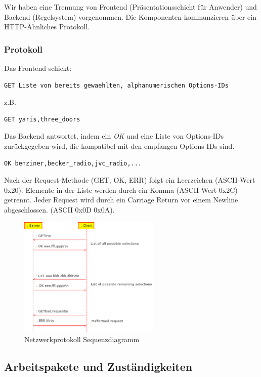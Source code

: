 \documentclass[a4paper,10pt]{article}
\begin{document}
Wir haben eine Trennung von Frontend (Präsentationsschicht für Anwender) und Backend (Regelsystem) vorgenommen.
Die Komponenten kommunzieren über ein HTTP-Ähnliches Protokoll.

\subsubsection{Protokoll}
Das Frontend schickt:

\begin{lstlisting}
GET Liste von bereits gewaehlten, alphanumerischen Options-IDs
\end{lstlisting}

z.B.

\begin{lstlisting}
GET yaris,three_doors
\end{lstlisting}

Das Backend antwortet, indem ein \textit{OK} und eine Liste von Options-IDs zurückgegeben wird, die kompatibel mit den empfangen Options-IDs sind.

\begin{lstlisting}
OK benziner,becker_radio,jvc_radio,...
\end{lstlisting}

Nach der Request-Methode (GET, OK, ERR) folgt ein Leerzeichen (ASCII-Wert 0x20). Elemente in der Liste werden durch ein Komma (ASCII-Wert 0x2C) getrennt.
Jeder Request wird durch ein Carriage Return vor einem Newline abgeschlossen. (ASCII 0x0D 0x0A).

\begin{figure}[htb]
	\centering
	\includegraphics[width=0.6\textwidth]{doc/netsequence.eps}
	\caption{Netzwerkprotokoll Sequenzdiagramm}
	\label{fig:networkproto_sequence}
\end{figure}

\subsection*{Arbeitspakete und Zuständigkeiten}
\end{document}
